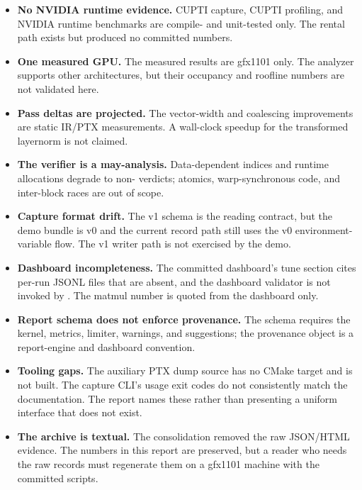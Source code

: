 \begin{itemize}
  \item \textbf{No NVIDIA runtime evidence.} CUPTI capture, CUPTI profiling,
        and NVIDIA runtime benchmarks are compile- and unit-tested only. The
        rental path exists but produced no committed numbers.
  \item \textbf{One measured GPU.} The measured results are gfx1101 only. The
        analyzer supports other architectures, but their occupancy and
        roofline numbers are not validated here.
  \item \textbf{Pass deltas are projected.} The vector-width and coalescing
        improvements are static IR/PTX measurements. A wall-clock speedup for
        the transformed layernorm is not claimed.
  \item \textbf{The verifier is a may-analysis.} Data-dependent indices and
        runtime allocations degrade to non- verdicts; atomics,
        warp-synchronous code, and inter-block races are out of scope.
  \item \textbf{Capture format drift.} The v1 schema is the reading contract,
        but the demo bundle is v0 and the current record path still uses the
        v0 environment-variable flow. The v1 writer path is not exercised by
        the demo.
  \item \textbf{Dashboard incompleteness.} The committed dashboard's tune
        section cites per-run JSONL files that are absent, and the dashboard
        validator is not invoked by . The matmul number is quoted
        from the dashboard only.
  \item \textbf{Report schema does not enforce provenance.} The schema
        requires the kernel, metrics, limiter, warnings, and suggestions; the
        provenance object is a report-engine and dashboard convention.
  \item \textbf{Tooling gaps.} The auxiliary PTX dump source has no CMake
        target and is not built. The capture CLI's usage exit codes do not
        consistently match the documentation. The report names these rather
        than presenting a uniform interface that does not exist.
  \item \textbf{The archive is textual.} The consolidation removed the raw
        JSON/HTML evidence. The numbers in this report are preserved, but a
        reader who needs the raw records must regenerate them on a gfx1101
        machine with the committed scripts.
\end{itemize}

